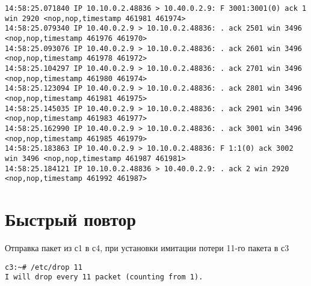 \documentclass[a4paper,12pt]{article}
\begin{document}
\begin{lstlisting}
14:58:25.071840 IP 10.10.0.2.48836 > 10.40.0.2.9: F 3001:3001(0) ack 1 win 2920 <nop,nop,timestamp 461981 461974>
14:58:25.079340 IP 10.40.0.2.9 > 10.10.0.2.48836: . ack 2501 win 3496 <nop,nop,timestamp 461976 461970>
14:58:25.093076 IP 10.40.0.2.9 > 10.10.0.2.48836: . ack 2601 win 3496 <nop,nop,timestamp 461978 461972>
14:58:25.104297 IP 10.40.0.2.9 > 10.10.0.2.48836: . ack 2701 win 3496 <nop,nop,timestamp 461980 461974>
14:58:25.123094 IP 10.40.0.2.9 > 10.10.0.2.48836: . ack 2801 win 3496 <nop,nop,timestamp 461981 461975>
14:58:25.145035 IP 10.40.0.2.9 > 10.10.0.2.48836: . ack 2901 win 3496 <nop,nop,timestamp 461983 461977>
14:58:25.162990 IP 10.40.0.2.9 > 10.10.0.2.48836: . ack 3001 win 3496 <nop,nop,timestamp 461985 461979>
14:58:25.183863 IP 10.40.0.2.9 > 10.10.0.2.48836: F 1:1(0) ack 3002 win 3496 <nop,nop,timestamp 461987 461981>
14:58:25.184121 IP 10.10.0.2.48836 > 10.40.0.2.9: . ack 2 win 2920 <nop,nop,timestamp 461992 461987>
\end{lstlisting}

\section{Быстрый повтор}
Отправка пакет из с1 в с4, при установки имитации потери 11-го пакета в с3
\begin{lstlisting}
c3:~# /etc/drop 11
I will drop every 11 packet (counting from 1).
\end{lstlisting}
\end{document}
